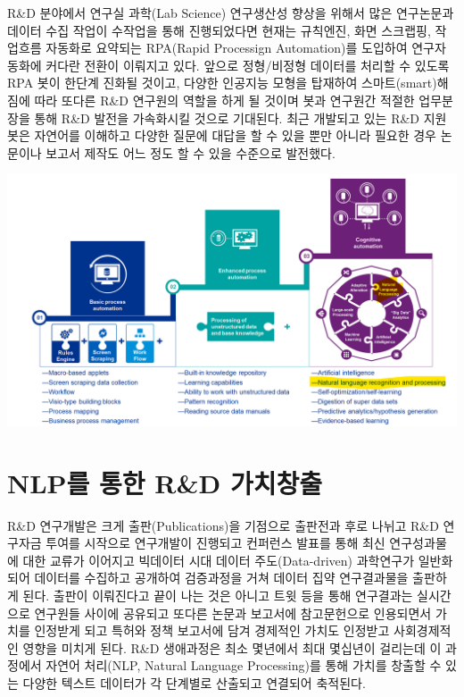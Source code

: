 \documentclass[smallextended]{svjour3}       %
\begin{document}
R\&D 분야에서 연구실 과학(Lab Science) 연구생산성 향상을 위해서 많은
연구논문과 데이터 수집 작업이 수작업을 통해 진행되었다면 현재는
규칙엔진, 화면 스크랩핑, 작업흐름 자동화로 요약되는 RPA(Rapid Processign
Automation)를 도입하여 연구자동화에 커다란 전환이 이뤄지고 있다. 앞으로
정형/비정형 데이터를 처리할 수 있도록 RPA 봇이 한단계 진화될 것이고,
다양한 인공지능 모형을 탑재하여 스마트(smart)해짐에 따라 또다른 R\&D
연구원의 역할을 하게 될 것이며 봇과 연구원간 적절한 업무분장을 통해 R\&D
발전을 가속화시킬 것으로 기대된다. 최근 개발되고 있는 R\&D 지원 봇은
자연어를 이해하고 다양한 질문에 대답을 할 수 있을 뿐만 아니라 필요한
경우 논문이나 보고서 제작도 어느 정도 할 수 있을 수준으로 발전했다.

\includegraphics{fig/koita-evolution.png}

\hypertarget{dimensions-ai}{%
\section{NLP를 통한 R\&D 가치창출}\label{dimensions-ai}}

R\&D 연구개발\citep{herzog2020dimensions}은 크게 출판(Publications)을
기점으로 출판전과 후로 나뉘고 R\&D 연구자금 투여를 시작으로 연구개발이
진행되고 컨퍼런스 발표를 통해 최신 연구성과물에 대한 교류가 이어지고
빅데이터 시대 데이터 주도(Data-driven) 과학연구가 일반화되어 데이터를
수집하고 공개하여 검증과정을 거쳐 데이터 집약 연구결과물을 출판하게
된다. 출판이 이뤄진다고 끝이 나는 것은 아니고 트윗 등을 통해 연구결과는
실시간으로 연구원들 사이에 공유되고 또다른 논문과 보고서에 참고문헌으로
인용되면서 가치를 인정받게 되고 특허와 정책 보고서에 담겨 경제적인
가치도 인정받고 사회경제적인 영향을 미치게 된다. R\&D 생애과정은 최소
몇년에서 최대 몇십년이 걸리는데 이 과정에서 자연어 처리(NLP, Natural
Language Processing)를 통해 가치를 창출할 수 있는 다양한 텍스트 데이터가
각 단계별로 산출되고 연결되어 축적된다.
\end{document}
